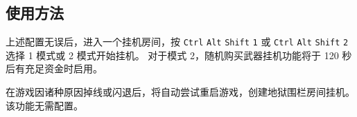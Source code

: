 \subsection{使用方法}

上述配置无误后，进入一个挂机房间，按 \lstinline{Ctrl} \lstinline{Alt} \lstinline{Shift} \lstinline{1} 或 \lstinline{Ctrl} \lstinline{Alt} \lstinline{Shift} \lstinline{2} 选择 1 模式或 2 模式开始挂机。
对于模式 2，随机购买武器挂机功能将于 120 秒后有充足资金时启用。

在游戏因诸种原因掉线或闪退后，将自动尝试重启游戏，创建地狱围栏房间挂机。该功能无需配置。